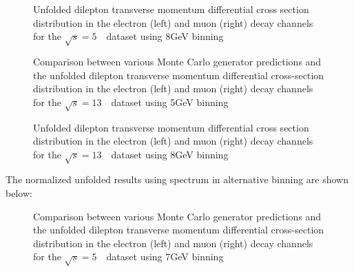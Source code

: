 \begin{figure}[h]
\centering
{}
\caption{Unfolded dilepton transverse momentum differential cross section distribution in the electron (left) and muon (right) \Zboson decay channels for the $\sqrt{s} = 5$~\TeV\ dataset using 8GeV binning}\end{figure}

\begin{figure}[h]
\centering
{}
\caption{Comparison between various Monte Carlo generator predictions and the unfolded dilepton transverse momentum differential cross-section distribution in the electron (left) and muon (right) \Zboson decay channels for the $\sqrt{s} = 13$~\TeV\ dataset using 5GeV binning}\label{f:MCData_Z_13}
\end{figure}

\begin{figure}[h]
\centering
{}
\caption{Unfolded dilepton transverse momentum differential cross section distribution in the electron (left) and muon (right) \Zboson decay channels for the $\sqrt{s} = 13$~\TeV\ dataset using 8GeV binning}\end{figure}





The normalized unfolded results using \ut spectrum in alternative binning are shown below:
\begin{figure}[h]
\centering
{}
\caption{Comparison between various Monte Carlo generator predictions and the unfolded dilepton transverse momentum differential cross-section distribution in the electron (left) and muon (right) \Zboson decay channels for the $\sqrt{s} = 5$~\TeV\ dataset using 7GeV binning}\label{f:MCData_Z_5_rebin7}
\end{figure}

